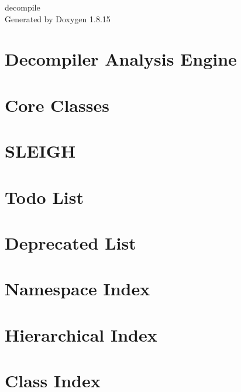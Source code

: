 \let\mypdfximage\pdfximage\def\pdfximage{\immediate\mypdfximage}\documentclass[twoside]{book}
\newcommand{\+}{\discretionary{\mbox{\scriptsize$\hookleftarrow$}}{}{}}
\newcommand{\clearemptydoublepage}{%
  \newpage{\pagestyle{empty}\cleardoublepage}%
}
\begin{document}
\hypersetup{pageanchor=false,
             bookmarksnumbered=true,
             pdfencoding=unicode
            }
\begin{titlepage}
\vspace*{7cm}
\begin{center}%
{\Large decompile }\\
\vspace*{1cm}
{\large Generated by Doxygen 1.8.15}\\
\end{center}
\end{titlepage}
\clearemptydoublepage
{}
\tableofcontents
\clearemptydoublepage
{}
\hypersetup{pageanchor=true}

\chapter{Decompiler Analysis Engine}
\label{index}\hypertarget{index}{}
\chapter{Core Classes}
\label{coreclasses}

\chapter{S\+L\+E\+I\+GH}
\label{sleigh}

\chapter{Todo List}
\label{todo}

\chapter{Deprecated List}
\label{deprecated}

\chapter{Namespace Index}

\chapter{Hierarchical Index}

\chapter{Class Index}

\end{document}
